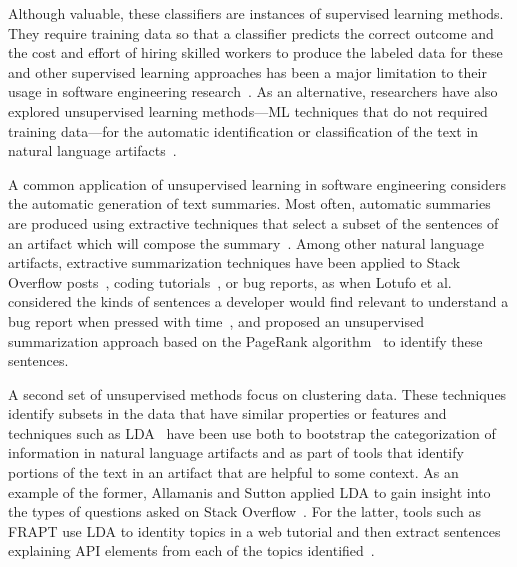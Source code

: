 Although valuable, these classifiers are instances of supervised learning methods.
They require training data so that a classifier predicts the correct outcome 
and the cost and effort of hiring skilled workers to produce 
the labeled data for these and other supervised learning approaches
has been a major limitation to their usage in software engineering research~\cite{Arpteg2018, ferreira2021}. As an alternative,
researchers have also explored 
 unsupervised learning methods---\acs{ML} techniques that do not required training data---for the automatic 
identification or classification of the text in natural language artifacts~\cite{}.





A common application of unsupervised learning in software engineering
considers the automatic generation of text summaries.
Most often, automatic summaries are produced 
using extractive techniques that select a subset of 
the sentences of an artifact which will compose the summary~\cite{a}.
Among other natural language artifacts,
extractive summarization techniques
have been applied to Stack Overflow posts~\cite{a}, coding tutorials~\cite{a},
or bug reports, as
when Lotufo et al. 
considered the kinds of sentences a developer would find relevant 
to understand a bug report when pressed with time~\cite{Lotufo2012},
and proposed an unsupervised summarization approach 
based on the PageRank algorithm~\cite{Page1999}
to identify these sentences. 




A second set of unsupervised methods focus on clustering data.
These techniques identify 
subsets in the data that have similar properties or features 
and techniques such as \acf{LDA}~\cite{blei2003latent}  have been use both to 
bootstrap the categorization of information in 
natural language artifacts and as part of tools that identify 
portions of the text in an artifact that are helpful to some context. 
As an example of the former, 
 Allamanis and Sutton
applied \acs{LDA}
to gain insight into the types of questions 
asked on Stack Overflow~\cite{Allamanis2013}.
For the latter, tools such as FRAPT
use \acs{LDA} to identity topics in a web tutorial
and then extract sentences explaining API elements from each of the topics identified~\cite{Jiang2017}.



